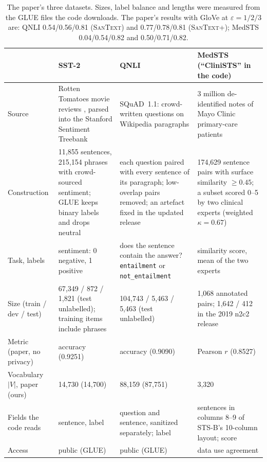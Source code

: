 \documentclass[11pt]{article}
\newcommand{\santext}{\textsc{SanText}}
\newcommand{\santextp}{\textsc{SanText}+}
\begin{document}
\begin{table}[t]
\centering
\small
\begin{tabularx}{\textwidth}{@{}>{\raggedright\arraybackslash}p{2.0cm}LLL@{}}
\toprule
 & \textbf{SST-2} & \textbf{QNLI} & \textbf{MedSTS} (``CliniSTS'' in the code) \\
\midrule
Source & Rotten Tomatoes movie reviews \citep{pang-lee-2005-seeing}, parsed into the Stanford Sentiment Treebank \citep{socher-etal-2013-recursive} & SQuAD~1.1: crowd-written questions on Wikipedia paragraphs \citep{rajpurkar-etal-2016-squad} & 3 million de-identified notes of Mayo Clinic primary-care patients \citep{wang2020medsts} \\
Construction & 11,855 sentences, 215,154 phrases with crowd-sourced sentiment; GLUE keeps binary labels and drops neutral \citep{wang2019glue} & each question paired with every sentence of its paragraph; low-overlap pairs removed; an artefact fixed in the updated release \citep{wang2019glue} & 174,629 sentence pairs with surface similarity $\ge 0.45$; a subset scored 0--5 by two clinical experts (weighted $\kappa = 0.67$) \\
Task, labels & sentiment: 0 negative, 1 positive & does the sentence contain the answer? \texttt{entailment} or \texttt{not\_entailment} & similarity score, mean of the two experts \\
Size (train / dev / test) & 67,349 / 872 / 1,821 (test unlabelled); training items include phrases & 104,743 / 5,463 / 5,463 (test unlabelled) & 1,068 annotated pairs; 1,642 / 412 in the 2019 n2c2 release \citep{wang2020n2c2} \\
Metric (paper, no privacy) & accuracy (0.9251) & accuracy (0.9090) & Pearson $r$ (0.8527) \\
Vocabulary $|V|$, paper (ours) & 14,730 (14,700) & 88,159 (87,751) & 3,320 \\
Fields the code reads & sentence, label & question and sentence, sanitized separately; label & sentences in columns 8--9 of STS-B's 10-column layout; score \\
Access & public (GLUE) & public (GLUE) & data use agreement \\
\bottomrule
\end{tabularx}
\caption{The paper's three datasets. Sizes, label balance and lengths were measured from the GLUE files the code downloads. The paper's results with GloVe at $\varepsilon = 1/2/3$ are: QNLI 0.54/0.56/0.81 (\santext) and 0.77/0.78/0.81 (\santextp); MedSTS 0.04/0.54/0.82 and 0.50/0.71/0.82.}
\label{tab:datasets}
\end{table}
\end{document}
